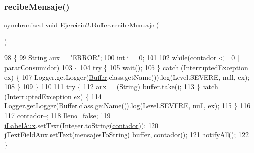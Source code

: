\subsubsection{\texorpdfstring{recibe\+Mensaje()}{recibeMensaje()}}
{\footnotesize\ttfamily synchronized void Ejercicio2.\+Buffer.\+recibe\+Mensaje (\begin{DoxyParamCaption}{ }\end{DoxyParamCaption})\hspace{0.3cm}{\ttfamily [inline]}}


\begin{DoxyCode}
98     \{
99         String aux = \textcolor{stringliteral}{"ERROR"};
100         \textcolor{keywordtype}{int} i = 0;
101         
102         \textcolor{keywordflow}{while}(\mbox{\hyperlink{class_ejercicio2_1_1_buffer_a323b888df0fbc24a4fd9da8dd1960639}{contador}} <= 0 || \mbox{\hyperlink{class_ejercicio2_1_1_buffer_ace8c2a56a3fa5d45cf9e3d979c5f9d17}{pararConsumidor}})
103         \{
104             \textcolor{keywordflow}{try} \{
105                 wait();
106             \} \textcolor{keywordflow}{catch} (InterruptedException ex) \{
107                 Logger.getLogger(\mbox{\hyperlink{class_ejercicio2_1_1_buffer_a3d628b4ba6b253cceefa6455fa44f164}{Buffer}}.class.getName()).log(Level.SEVERE, null, ex);
108             \}
109         \}
110         
111         \textcolor{keywordflow}{try} \{
112             aux = (String) \mbox{\hyperlink{class_ejercicio2_1_1_buffer_a63ddce4482528c08b1023ab9ea3842ce}{buffer}}.take();
113         \} \textcolor{keywordflow}{catch} (InterruptedException ex) \{
114             Logger.getLogger(\mbox{\hyperlink{class_ejercicio2_1_1_buffer_a3d628b4ba6b253cceefa6455fa44f164}{Buffer}}.class.getName()).log(Level.SEVERE, null, ex);
115         \}
116         
117         \mbox{\hyperlink{class_ejercicio2_1_1_buffer_a323b888df0fbc24a4fd9da8dd1960639}{contador}}--;
118         \mbox{\hyperlink{class_ejercicio2_1_1_buffer_a2f6412c605d99ad74a4f325e5d8b0385}{lleno}}=\textcolor{keyword}{false};
119         \mbox{\hyperlink{class_ejercicio2_1_1_buffer_a032718b3d95a8db4bc7846846134e4e6}{jLabelAux}}.setText(Integer.toString(\mbox{\hyperlink{class_ejercicio2_1_1_buffer_a323b888df0fbc24a4fd9da8dd1960639}{contador}}));
120         \mbox{\hyperlink{class_ejercicio2_1_1_buffer_a33d8699257b7b05f8023b7a49f7ef7e0}{jTextFieldAux}}.setText(\mbox{\hyperlink{class_ejercicio2_1_1_buffer_a434d7d9dfdec59f5a88a52ea67eeca01}{mensajesToString}}(
      \mbox{\hyperlink{class_ejercicio2_1_1_buffer_a63ddce4482528c08b1023ab9ea3842ce}{buffer}}, \mbox{\hyperlink{class_ejercicio2_1_1_buffer_a323b888df0fbc24a4fd9da8dd1960639}{contador}}));
121         notifyAll();
122     \}
\end{DoxyCode}


